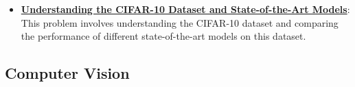 \documentclass{article}%
\begin{document}
\begin{itemize}[leftmargin=*]
\item \href{https://purdue.brightspace.com/d2l/common/assets/pdfjs-d2l-dist/1.0.14-legacy/web/viewer.html?file=\%2Fcontent\%2Fenforced\%2F1095467-wl.202510.CS.24300.001\%2F09L1-cnn.pdf\%3Fou\%3D1095467\&lang=en-us\&container=d2l-fileviewer-rendered-pdf\&fullscreen=d2l-fileviewer-rendered-pdf-dialog\&height=667#page=23}{\textbf{Understanding the CIFAR-10 Dataset and State-of-the-Art Models}}: This problem involves understanding the CIFAR-10 dataset and comparing the performance of different state-of-the-art models on this dataset.%
\end{itemize}

%
\subsection{Computer Vision}%
\label{subsec:ComputerVision}%
\end{document}
